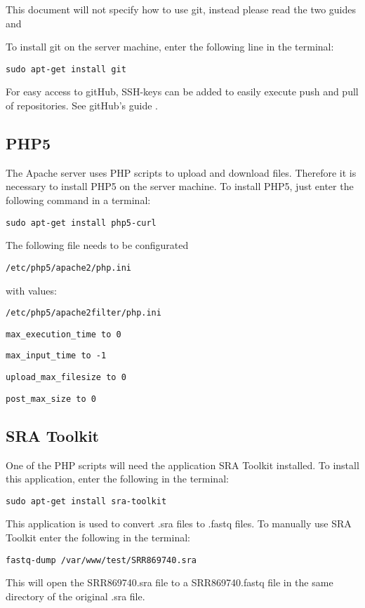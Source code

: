 This document will not specify how to use git, instead please read the two guides \cite{exp_gitguide} and \cite{exp_gitguide2}

To install git on the server machine, enter the following line in the terminal:
\begin{verbatim}sudo apt-get install git\end{verbatim}
For easy access to gitHub, SSH-keys can be added to easily execute push and pull of repositories. 
See gitHub's guide \cite{exp_sshguide}.

\subsection{PHP5}
The Apache server uses PHP scripts to upload and download files. Therefore it is necessary to install PHP5 on the server machine. To install PHP5, just enter the following command in a terminal:
\begin{verbatim}sudo apt-get install php5-curl\end{verbatim}

The following file needs to be configurated \begin{verbatim}/etc/php5/apache2/php.ini\end{verbatim} with values:

\begin{verbatim}/etc/php5/apache2filter/php.ini\end{verbatim}

\begin{verbatim}max_execution_time to 0\end{verbatim}
\begin{verbatim}max_input_time to -1\end{verbatim}
\begin{verbatim}upload_max_filesize to 0\end{verbatim}
\begin{verbatim}post_max_size to 0\end{verbatim}

\subsection{SRA Toolkit}
One of the PHP scripts will need the application SRA Toolkit installed. To install this application, enter the following in the terminal:
\begin{verbatim}sudo apt-get install sra-toolkit\end{verbatim}
This application is used to convert .sra files to .fastq files. To manually use SRA Toolkit enter the following in the terminal:
\begin{verbatim}fastq-dump /var/www/test/SRR869740.sra\end{verbatim}
This will open the SRR869740.sra file to a SRR869740.fastq file in the same directory of the original .sra file.

